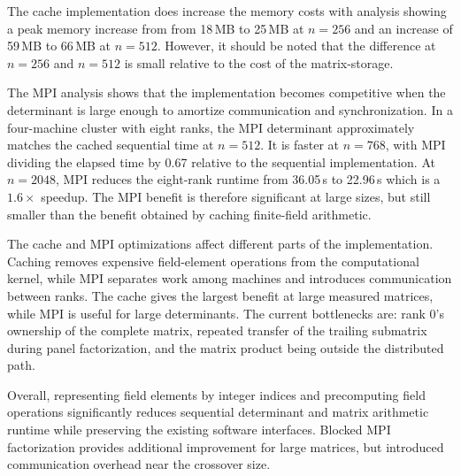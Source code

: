 The cache implementation does increase the memory costs with analysis showing a peak memory increase from from 18\,MB to 25\,MB at \(n = 256\) and an increase of 59\,MB to 66\,MB at \(n = 512\).
However, it should be noted that the difference at \(n = 256\) and \(n = 512\) is small relative to the cost of the matrix-storage.

The MPI analysis shows that the implementation becomes competitive when the determinant is large enough to amortize communication and synchronization.
In a four-machine cluster with eight ranks, the MPI determinant approximately matches the cached sequential time at \(n=512\).
It is faster at \(n=768\), with MPI dividing the elapsed time by 0.67 relative to the sequential implementation.
At \(n=2048\), MPI reduces the eight-rank runtime from 36.05\,s to 22.96\,s which is a \(1.6\times\) speedup. The MPI benefit is therefore significant at large sizes, but still smaller than the benefit obtained by caching finite-field arithmetic.

The cache and MPI optimizations affect different parts of the implementation.
Caching removes expensive field-element operations from the computational kernel, while MPI separates work among machines and introduces communication between ranks.
The cache gives the largest benefit at large measured matrices, while MPI is useful for large determinants.
The current bottlenecks are: rank 0's ownership of the complete matrix, repeated transfer of the trailing submatrix during panel factorization, and the matrix product being outside the distributed path.

Overall, representing field elements by integer indices and precomputing field operations significantly reduces sequential determinant and matrix arithmetic runtime while preserving the existing software interfaces.
Blocked MPI factorization provides additional improvement for large matrices, but introduced communication overhead near the crossover size.
